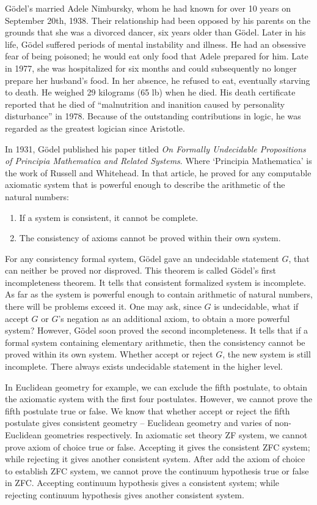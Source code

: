 \documentclass[b5paper]{article}
\begin{document}
Gödel's married Adele Nimbursky, whom he had known for over 10 years on September 20th, 1938. Their relationship had been opposed by his parents on the grounds that she was a divorced dancer, six years older than Gödel. Later in his life, Gödel suffered periods of mental instability and illness. He had an obsessive fear of being poisoned; he would eat only food that Adele prepared for him. Late in 1977, she was hospitalized for six months and could subsequently no longer prepare her husband's food. In her absence, he refused to eat, eventually starving to death. He weighed 29 kilograms (65 lb) when he died. His death certificate reported that he died of ``malnutrition and inanition caused by personality disturbance'' in 1978. Because of the outstanding contributions in logic, he was regarded as the greatest logician since Aristotle.

In 1931, Gödel published his paper titled {\em On Formally Undecidable Propositions of Principia Mathematica and Related Systems}. Where `Principia Mathematica' is the work of Russell and Whitehead. In that article, he proved for any computable axiomatic system that is powerful enough to describe the arithmetic of the natural numbers:

\begin{enumerate}
\item If a system is consistent, it cannot be complete.
\item The consistency of axioms cannot be proved within their own system.
\end{enumerate}

For any consistency formal system, Gödel gave an undecidable statement $G$, that can neither be proved nor disproved. This theorem is called Gödel's first incompleteness theorem. It tells that consistent formalized system is incomplete. As far as the system is powerful enough to contain arithmetic of natural numbers, there will be problems exceed it. One may ask, since $G$ is undecidable, what if accept $G$ or $G$'s negation as an additional axiom, to obtain a more powerful system? However, Gödel soon proved the second incompleteness. It tells that if a formal system containing elementary arithmetic, then the consistency cannot be proved within its own system. Whether accept or reject $G$, the new system is still incomplete. There always exists undecidable statement in the higher level.

In Euclidean geometry for example, we can exclude the fifth postulate, to obtain the axiomatic system with the first four postulates. However, we cannot prove the fifth postulate true or false. We know that whether accept or reject the fifth postulate gives consistent geometry -- Euclidean geometry and varies of non-Euclidean geometries respectively. In axiomatic set theory ZF system, we cannot prove axiom of choice true or false. Accepting it gives the consistent ZFC system; while rejecting it gives another consistent system. After add the axiom of choice to establish ZFC system, we cannot prove the continuum hypothesis true or false in ZFC. Accepting continuum hypothesis gives a consistent system; while rejecting continuum hypothesis gives another consistent system.
\end{document}
